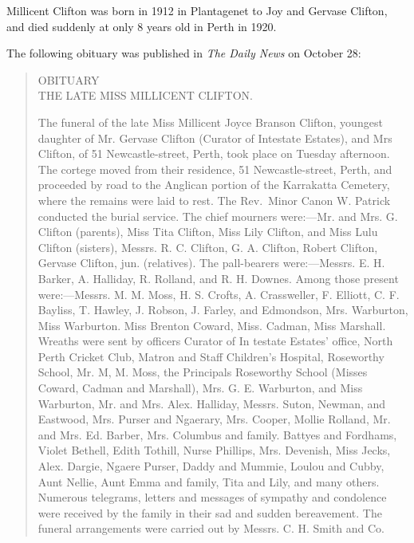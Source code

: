 
Millicent Clifton was born in 1912 in Plantagenet\cite{MJBCbirth} to Joy and Gervase Clifton, and died suddenly at only 8 years old in Perth in 1920.\cite{MJBCdeath}

The following obituary was published in \emph{The Daily News} on October 28:\cite{MJBCobit}

\begin{quotation}
\begin{center}
OBITUARY \\
THE LATE MISS MILLICENT CLIFTON.
\end{center}

The funeral of the late Miss Millicent Joyce Branson Clifton, youngest daughter of Mr. Gervase Clifton (Curator of Intestate Estates), and Mrs Clifton, of 51 Newcastle-street, Perth, took place on Tuesday afternoon. The cortege moved from their residence, 51 Newcastle-street, Perth, and proceeded by road to the Anglican portion of the Karrakatta Cemetery, where the remains were laid to rest. The Rev.\ Minor Canon W. Patrick conducted the burial service. The chief mourners were:---Mr. and Mrs. G. Clifton (parents), Miss Tita Clifton, Miss Lily Clifton, and Miss Lulu Clifton (sisters), Messrs. R. C. Clifton, G. A. Clifton, Robert Clifton, Gervase Clifton, jun. (relatives). The pall-bearers were:---Messrs. E. H. Barker, A. Halliday, R. Rolland, and R. H. Downes. Among those present were:---Messrs. M. M. Moss, H. S. Crofts, A. Crassweller, F. Elliott, C. F. Bayliss, T. Hawley, J. Robson, J. Farley, and Edmondson, Mrs. Warburton, Miss Warburton. Miss Brenton Coward, Miss. Cadman, Miss Marshall. Wreaths were sent by officers Curator of In testate Estates' office, North Perth Cricket Club, Matron and Staff Children's Hospital, Roseworthy School, Mr. M, M. Moss, the Principals Roseworthy School (Misses Coward, Cadman and Marshall), Mrs. G. E. Warburton, and Miss Warburton, Mr. and Mrs. Alex. Halliday, Messrs. Suton, Newman, and Eastwood, Mrs. Purser and Ngaerary, Mrs. Cooper, Mollie Rolland, Mr. and Mrs. Ed. Barber, Mrs. Columbus and family. Battyes and Fordhams, Violet Bethell, Edith Tothill, Nurse Phillips, Mrs. Devenish, Miss Jecks, Alex. Dargie, Ngaere Purser, Daddy and Mummie, Loulou and Cubby, Aunt Nellie, Aunt Emma and family, Tita and Lily, and many others. Numerous telegrams, letters and messages of sympathy and condolence were received by the family in their sad and sudden bereavement. The funeral arrangements were carried out by Messrs. C. H. Smith and Co.
\end{quotation}
